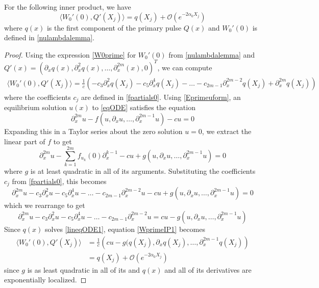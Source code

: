 \documentclass[thesis.tex]{subfiles}
\begin{document}
\begin{lemma}\label{lemma:WprimeIP}
For the following inner product, we have
\begin{equation}\label{WprimeIP}
\langle W_0'(0), Q'(X_j) \rangle = q(X_j) + \mathcal{O}(e^{-2\alpha_0 X_j})
\end{equation}
where $q(x)$ is the first component of the primary pulse $Q(x)$ and $W_0'(0)$ is defined in \cref{nulambdalemma}.
\begin{proof}
Using the expression \cref{W0prime} for $W_0'(0)$ from \cref{nulambdalemma} and $Q'(x) = (\partial_x q(x), \partial_x^2 q(x), \dots, \partial_x^{2m}(x), 0)^T$, we can compute
\begin{align}\label{WprimeIP1}
\langle W_0'(0), Q'(X_j) \rangle = 
\frac{1}{c} \left( -c_3 \partial_x^2 q(X_j) -c_5 \partial_x^4 q(X_j) -\dots -c_{2m-1} \partial_x^{2m-2} q(X_j) + \partial_x^{2m} q(X_j) \right)
\end{align}
where the coefficients $c_j$ are defined in \cref{fpartials0}. Using \cref{Eprimeuform}, an equilibrium solution $u(x)$ to \cref{eqODE} satisfies the equation
\[
\partial_x^{2m} u- f(u, \partial_x u, \dots, \partial_x^{2m-1}u ) - cu = 0
\]
Expanding this in a Taylor series about the zero solution $u = 0$, we extract the linear part of $f$  to get
\[
\partial_x^{2m} u - \sum_{k=1}^{2m} f_{u_k}(0) \partial_x^{k-1} - cu + g(u, \partial_x u, \dots, \partial_x^{2m-1}u ) = 0
\]
where $g$ is at least quadratic in all of its arguments. Substituting the coefficients $c_j$ from \cref{fpartials0}, this becomes
\begin{equation*}
\partial_x^{2m} u - c_3 \partial_x^2 u - c_5 \partial_x^4 u - \dots - c_{2m-1} \partial_x^{2m-2}u - cu + g(u, \partial_x u, \dots, \partial_x^{2m-1}u ) = 0
\end{equation*}
which we rearrange to get 
\begin{equation}\label{lineqODE1}
\partial_x^{2m} u - c_3 \partial_x^2 u - c_5 \partial_x^4 u - \dots - c_{2m-1} \partial_x^{2m-2}u = cu - g(u, \partial_x u, \dots, \partial_x^{2m-1}u )
\end{equation}
Since $q(x)$ solves \cref{lineqODE1}, equation \cref{WprimeIP1} becomes
\begin{align*}
\langle W_0'(0), Q'(X_j) \rangle &= 
\frac{1}{c} \left( cu - g(q(X_j), \partial_x q(X_j), \dots, \partial_x^{2m-1}q(X_j) \right) \\
&= q(X_j) + \mathcal{O}(e^{-2\alpha_0 X_j})
\end{align*}
since $g$ is as least quadratic in all of its and $q(x)$ and all of its derivatives are exponentially localized.
\end{proof}
\end{lemma}
\end{document}
